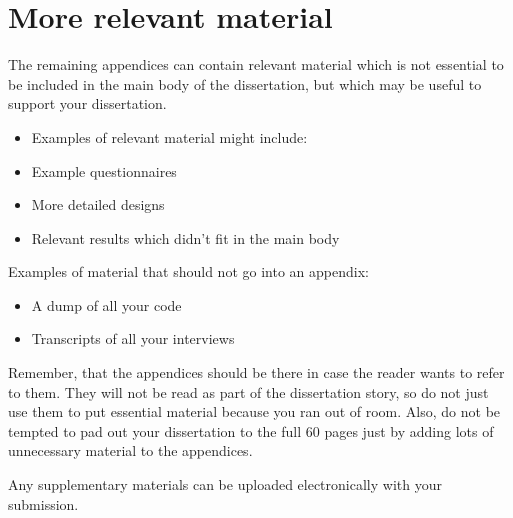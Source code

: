 \section{More relevant material}
The remaining appendices can contain relevant material which is not essential to be included in the main body of the dissertation, but which may be useful to support your dissertation.  


\begin{itemize}
\item	Examples of relevant material might include:
\item	Example questionnaires
\item	More detailed designs
\item	Relevant results which didn’t fit in the main body
\end{itemize}
Examples of material that should not go into an appendix:
\begin{itemize}
\item	A dump of all your code
\item	Transcripts of all your interviews
\end{itemize}
Remember, that the appendices should be there in case the reader wants to refer to them.  They will not be read as part of the dissertation story, so do not just use them to put essential material because you ran out of room.  Also, do not be tempted to pad out your dissertation to the full 60 pages just by adding lots of unnecessary material to the appendices.

Any supplementary materials can be uploaded electronically with your submission.
